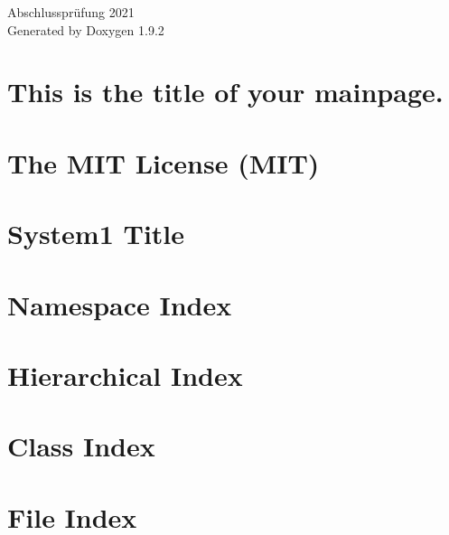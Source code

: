 \documentclass[twoside]{book}
\newcommand{\+}{\discretionary{\mbox{\scriptsize$\hookleftarrow$}}{}{}}
\newcommand{\clearemptydoublepage}{%
    \newpage{\pagestyle{empty}\cleardoublepage}%
  }
\begin{document}
  \raggedbottom
    \hypersetup{pageanchor=false,
                bookmarksnumbered=true,
                pdfencoding=unicode
               }
  \begin{titlepage}
  \vspace*{7cm}
  \begin{center}%
  {\Large Abschlussprüfung 2021}\\
  \vspace*{1cm}
  {\large Generated by Doxygen 1.9.2}\\
  \end{center}
  \end{titlepage}
  \clearemptydoublepage
  \tableofcontents
  \clearemptydoublepage
  \hypersetup{pageanchor=true}
\chapter{This is the title of your mainpage.}
\label{index}\hypertarget{index}{}
\chapter{The MIT License (MIT)}
\label{md__abschlussprojekt2021_wwwroot_lib_jquery_validation__l_i_c_e_n_s_e}

\chapter{System1 Title}
\label{subsystem1}

\chapter{Namespace Index}

\chapter{Hierarchical Index}

\chapter{Class Index}

\chapter{File Index}

\end{document}
